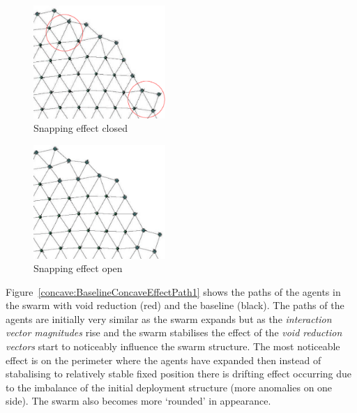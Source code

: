 \documentclass[preprint,12pt]{elsarticle}
\begin{document}
\begin{figure}
\begin{center}
\includegraphics[width=5cm]{figures/OuterPerimeterJitter1}
\end{center}
\caption{Snapping effect closed\label{fig:OuterPerimeterJitter1}}
\end{figure}
\begin{figure}
\begin{center}
\includegraphics[width=5cm]{figures/OuterPerimeterJitter2}
\end{center}
\caption{Snapping effect open\label{fig:OuterPerimeterJitter2}}
\end{figure}
Figure~\ref{concave:BaselineConcaveEffectPath1} shows the paths of the agents in the swarm with void reduction (red) and the baseline (black). The paths of the agents are initially very similar as the swarm expands but as the \textit{interaction vector magnitudes} rise and the swarm stabilises the effect of the \textit{void reduction vectors} start to noticeably influence the swarm structure. The most noticeable effect is on the perimeter where the agents have expanded then instead of stabalising to relatively stable fixed position there is drifting effect occurring due to the imbalance of the initial deployment structure (more anomalies on one side). The swarm also becomes more `rounded' in appearance. 
\end{document}

